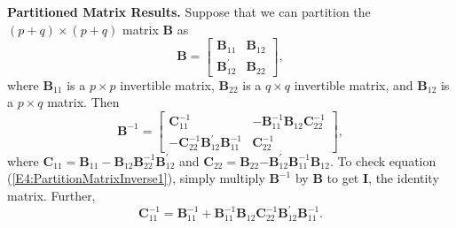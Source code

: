 \textbf{Partitioned Matrix Results.} Suppose that we can partition
the $(p+q)\times (p+q)$ matrix $\mathbf{B}$ as
\begin{equation*}
\mathbf{B}=%
\begin{bmatrix}
\mathbf{B}_{11} & \mathbf{B}_{12} \\
\mathbf{B}_{12}^{\prime } & \mathbf{B}_{22}%
\end{bmatrix},
\end{equation*}
where $\mathbf{B}_{11}$ is a $p\times p$ invertible matrix,
$\mathbf{B}_{22}$ is a $q\times q$ invertible matrix, and
$\mathbf{B}_{12}$ is a $p\times q$ matrix. Then
\begin{equation}\label{E4:PartitionMatrixInverse1}
\mathbf{B}^{-1}=%
\begin{bmatrix}
\mathbf{C}_{11}^{-1} &
- \mathbf{B}_{11}^{-1}\mathbf{B}_{12}\mathbf{C}_{22}^{-1} \\
- \mathbf{C}_{22}^{-1} \mathbf{B}_{12}^{\prime} \mathbf{B}_{11}^{-1}
& \mathbf{C}_{22}^{-1}
\end{bmatrix},
\end{equation}
where
$\mathbf{C}_{11}=\mathbf{B}_{11}-\mathbf{B}_{12}\mathbf{B}_{22}^{-1}
\mathbf{B}_{12}^{\prime }$ and
$\mathbf{C}_{22}=\mathbf{B}_{22}\mathbf{-B}_{12}^{\prime
}\mathbf{B}_{11}^{-1}\mathbf{B}_{12}$. To check equation
(\ref{E4:PartitionMatrixInverse1}), simply multiply
$\mathbf{B}^{-1}$ by $\mathbf{B}$ to get $\mathbf{I}$, the identity
matrix. Further,
\begin{equation}\label{E4:PartitionMatrixInverse2}
\mathbf{C}_{11}^{-1}  = \mathbf{B}_{11}^{-1} + \mathbf{B}_{11}^{-1}
\mathbf{B}_{12} \mathbf{C}_{22}^{-1} \mathbf{B}_{12}^{\prime}
\mathbf{B}_{11}^{-1}.
\end{equation}

